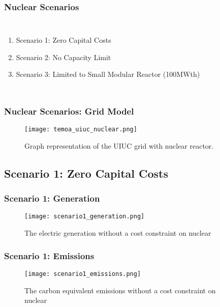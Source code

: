 \begin{frame}
  \frametitle{Nuclear Scenarios}
  \begin{columns}
    \column[t]{3cm}
    \begin{enumerate}
      \item Scenario 1: Zero Capital Costs
      \item Scenario 2: No Capacity Limit
      \item Scenario 3: Limited to Small Modular Reactor (100MWth)
    \end{enumerate}

    \column[t]{7cm}
    \begin{table}
      \centering
      \caption{Summary of Nuclear Scenarios. Costs from EIA and NEI reports \cite{desai_nuclear_2018}\cite{us_department_of_energy_capital_2016}.}
      \label{table:scenarios}
    \end{table}
  \end{columns}
\end{frame}

\begin{frame}
  \frametitle{Nuclear Scenarios: Grid Model}
  \begin{figure}
    \texttt{[image: temoa\_uiuc\_nuclear.png]}
    \caption{Graph representation of the UIUC grid with nuclear reactor.}
    \label{fig:nuclear-uiuc}
  \end{figure}
\end{frame}


\subsection{Scenario 1: Zero Capital Costs}
\begin{frame}
  \frametitle{Scenario 1: Generation}
    \begin{figure}
      \texttt{[image: scenario1\_generation.png]}
      \caption{The electric generation without a cost constraint on nuclear}
      \label{fig:gen01}
    \end{figure}
\end{frame}
\begin{frame}
  \frametitle{Scenario 1: Emissions}
  \begin{figure}
    \texttt{[image: scenario1\_emissions.png]}
    \caption{The carbon equivalent emissions without a cost constraint on nuclear}
    \label{fig:emit01}
  \end{figure}
\end{frame}
